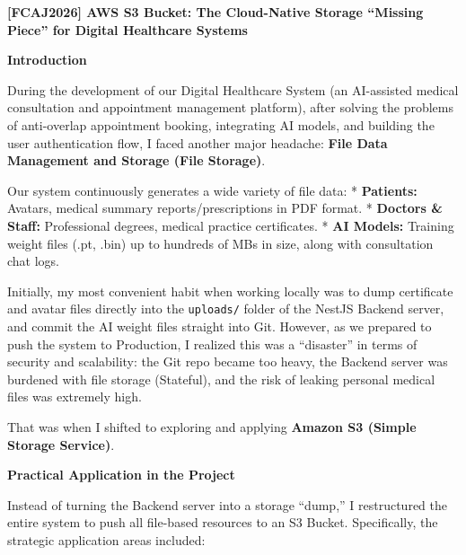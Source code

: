 \vspace{0.5em}\noindent\textbf{{[}FCAJ2026{]} AWS S3 Bucket: The Cloud-Native Storage
``Missing Piece'' for Digital Healthcare Systems}

\vspace{0.5em}\noindent\textbf{Introduction}

During the development of our Digital Healthcare System (an AI-assisted
medical consultation and appointment management platform), after solving
the problems of anti-overlap appointment booking, integrating AI models,
and building the user authentication flow, I faced another major
headache: \textbf{File Data Management and Storage (File Storage)}.

Our system continuously generates a wide variety of file data: *
\textbf{Patients:} Avatars, medical summary reports/prescriptions in PDF
format. * \textbf{Doctors \& Staff:} Professional degrees, medical
practice certificates. * \textbf{AI Models:} Training weight files (.pt,
.bin) up to hundreds of MBs in size, along with consultation chat logs.

Initially, my most convenient habit when working locally was to dump
certificate and avatar files directly into the \texttt{uploads/} folder
of the NestJS Backend server, and commit the AI weight files straight
into Git. However, as we prepared to push the system to Production, I
realized this was a ``disaster'' in terms of security and scalability:
the Git repo became too heavy, the Backend server was burdened with file
storage (Stateful), and the risk of leaking personal medical files was
extremely high.

That was when I shifted to exploring and applying \textbf{Amazon S3
(Simple Storage Service)}.

\vspace{0.5em}\noindent\textbf{Practical Application in the Project}

Instead of turning the Backend server into a storage ``dump,'' I
restructured the entire system to push all file-based resources to an S3
Bucket. Specifically, the strategic application areas included:

